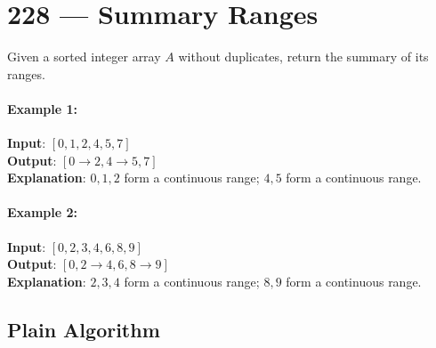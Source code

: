 \section{228 --- Summary Ranges}
Given a sorted integer array $A$ without duplicates, return the summary of its ranges.

\paragraph{Example 1:}

\begin{flushleft}
\textbf{Input}:  $[0,1,2,4,5,7]$
\\
\textbf{Output}: $[0\to2, 4\to5, 7]$
\\
\textbf{Explanation}: $0,1,2$ form a continuous range; $4,5$ form a continuous range.
\end{flushleft}

\paragraph{Example 2:}

\begin{flushleft}
\textbf{Input}:  $[0,2,3,4,6,8,9]$
\\
\textbf{Output}: $[0,2\to4,6,8\to9]$
\\
\textbf{Explanation}: $2,3,4$ form a continuous range; $8,9$ form a continuous range.
\end{flushleft}
\subsection{Plain Algorithm}

